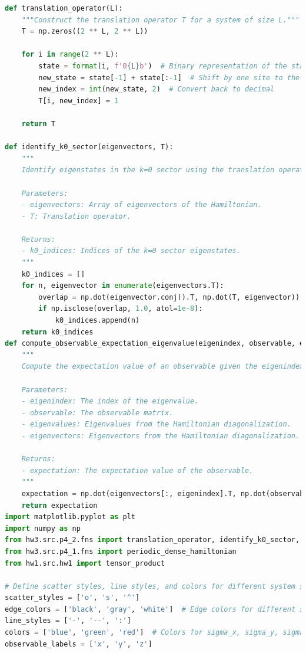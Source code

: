 \documentclass[12pt]{article}
\begin{document}
\begin{lstlisting}[language=Python]
def translation_operator(L):
    """Construct the translation operator T for a system of size L."""
    T = np.zeros((2 ** L, 2 ** L))

    for i in range(2 ** L):
        state = format(i, f'0{L}b')  # Binary representation of the state
        new_state = state[-1] + state[:-1]  # Shift by one site to the right
        new_index = int(new_state, 2)  # Convert back to decimal
        T[i, new_index] = 1

    return T

def identify_k0_sector(eigenvectors, T):
    """
    Identify eigenstates in the k=0 sector using the translation operator T.
    
    Parameters:
    - eigenvectors: Array of eigenvectors of the Hamiltonian.
    - T: Translation operator.
    
    Returns:
    - k0_indices: Indices of the k=0 sector eigenstates.
    """
    k0_indices = []
    for n, eigenvector in enumerate(eigenvectors.T):
        overlap = np.dot(eigenvector.conj().T, np.dot(T, eigenvector))
        if np.isclose(overlap, 1.0, atol=1e-8):
            k0_indices.append(n)
    return k0_indices
def compute_observable_expectation_eigenvalue(eigenindex, observable, eigenvectors):
    """
    Compute the expectation value of an observable given the eigenindex.
    
    Parameters:
    - eigenindex: The index of the eigenvalue.
    - observable: The observable matrix.
    - eigenvalues: Eigenvalues from the Hamiltonian diagonalization.
    - eigenvectors: Eigenvectors from the Hamiltonian diagonalization.
    
    Returns:
    - expectation: The expectation value of the observable.
    """
    expectation = np.dot(eigenvectors[:, eigenindex].T, np.dot(observable, eigenvectors[:, eigenindex]))
    return expectation
import matplotlib.pyplot as plt
import numpy as np
from hw3.src.p4_2.fns import translation_operator, identify_k0_sector, compute_observable_expectation_eigenvalue
from hw3.src.p4_1.fns import periodic_dense_hamiltonian
from hw1.src.hw1 import tensor_product

# Define scatter styles, line styles, and colors for different system sizes and observables
scatter_styles = ['o', 's', '^']
edge_colors = ['black', 'gray', 'white']  # Edge colors for different system sizes
line_styles = ['-', '--', ':']
colors = ['blue', 'green', 'red']  # Colors for sigma_x, sigma_y, sigma_z
observable_labels = ['x', 'y', 'z']


\end{lstlisting}
\end{document}
